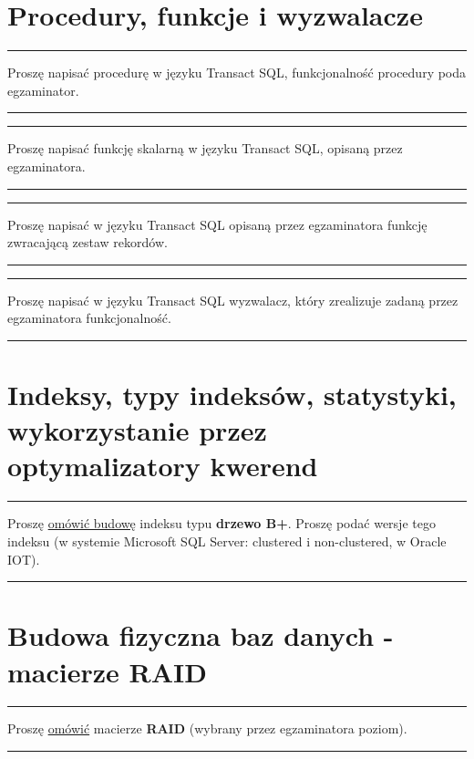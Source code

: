 \documentclass[a5paper,6pt]{article}
\newcommand{\horrule}[1]{\rule{\linewidth}{#1}}
\begin{document}

    \section{Procedury, funkcje i wyzwalacze} %
    \label{sec:procedury_funkcje_i_wyzwalacze}

    \horrule{0.5pt}
    Proszę napisać procedurę w języku Transact SQL, funkcjonalność procedury
    poda egzaminator.\\
    \horrule{0.5pt}

    \horrule{0.5pt}
    Proszę napisać funkcję skalarną w języku Transact SQL, opisaną przez
    egzaminatora.\\
    \horrule{0.5pt}

    \horrule{0.5pt}
    Proszę napisać w języku Transact SQL opisaną przez egzaminatora funkcję
    zwracającą zestaw rekordów.\\
    \horrule{0.5pt}

    \horrule{0.5pt}
    Proszę napisać w języku Transact SQL wyzwalacz, który zrealizuje zadaną
    przez egzaminatora funkcjonalność.\\
    \horrule{0.5pt}


\pagebreak

    \section{Indeksy, typy indeksów, statystyki, wykorzystanie przez
             optymalizatory kwerend} %
    \label{sec:indeksy}

    \horrule{0.5pt}
    Proszę \underline{omówić budowę} indeksu typu \textbf{drzewo B+}. Proszę
    podać wersje tego indeksu (w systemie Microsoft SQL Server: clustered i
    non-clustered, w Oracle IOT).\\
    \horrule{0.5pt}

\pagebreak


    \section{Budowa fizyczna baz danych - macierze RAID} %
    \label{sec:budowa_fizyczna_baz_danych_macierze_raid}

    \horrule{0.5pt}
    Proszę \underline{omówić} macierze \textbf{RAID} (wybrany przez
    egzaminatora poziom).\\
    \horrule{0.5pt}
\end{document}
